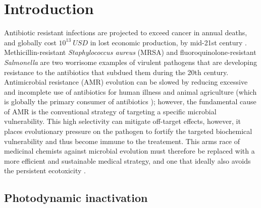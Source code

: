 \label{PDIpy_chapter}

\section{Introduction}
Antibiotic resistant infections are projected to exceed cancer in annual deaths, and globally cost $10^{13}~USD$ in lost economic production, by mid-21st century \cite{ONeill2014AntimicrobialNations}. Methicillin-resistant \textit{Staphylococcus aureus} (MRSA) \cite{Song2011SpreadStudy,Borg2007PrevalenceCountries} and fluoroquinolone-resistant \textit{Salmonella} \cite{Moghnieh2018EpidemiologyLeague} are two worrisome examples of virulent pathogens that are developing resistance to the antibiotics that subdued them during the 20th century. Antimicrobial resistance (AMR) evolution can be slowed by reducing excessive and incomplete use of antibiotics for human illness and animal agriculture (which is globally the primary consumer of antibiotics \cite{VanBoeckel2017ReducingAnimals,Eggleton2020TheWorld}); however, the fundamental cause of AMR is the conventional strategy of targeting a specific microbial vulnerability. This high selectivity can mitigate off-target effects, however, it places evolutionary pressure on the pathogen to fortify the targeted biochemical vulnerability and thus become immune to the treatement. This arms race of medicinal chemists against microbial evolution must therefore be replaced with a more efficient and sustainable medical strategy, and one that ideally also avoids the persistent ecotoxicity  \cite{Thomas2001AntifoulingEffects,Niu2016RolesIrradiation,Winters1983ControlDesalination}.

\subsection{Photodynamic inactivation}

